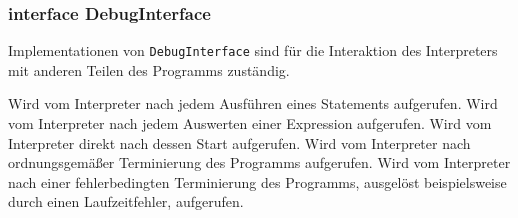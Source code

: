 \subsubsection{interface DebugInterface}
Implementationen von \texttt{DebugInterface} sind für die Interaktion des Interpreters mit anderen Teilen des Programms zuständig.

\begin{description}
    Wird vom Interpreter nach jedem Ausführen eines Statements aufgerufen.
    Wird vom Interpreter nach jedem Auswerten einer Expression aufgerufen.
    Wird vom Interpreter direkt nach dessen Start aufgerufen.
    Wird vom Interpreter nach ordnungsgemäßer Terminierung des Programms aufgerufen.
    Wird vom Interpreter nach einer fehlerbedingten Terminierung des Programms, ausgelöst beispielsweise durch einen Laufzeitfehler, aufgerufen.
\end{description}
